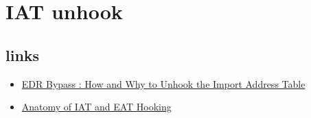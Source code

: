\section{IAT unhook}

\subsection{links}
\begin{itemize}
    \item \href{https://alice.climent-pommeret.red/posts/how-and-why-to-unhook-the-import-address-table/}{EDR Bypass : How and Why to Unhook the Import Address Table}
    \item \href{https://securitymaven.medium.com/anatomy-of-iat-and-eat-hooking-9612eb15baf1}{Anatomy of IAT and EAT Hooking}
\end{itemize}